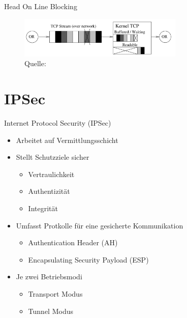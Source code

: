 \documentclass{beamer}
\begin{document}
\begin{frame}{Head On Line Blocking}
  \begin{figure}
    \includegraphics[width=0.7\textwidth]{pics/headonlinevanilla.pdf}
    \caption{Quelle: \cite{tcp-over-dtls}}
  \end{figure}
\end{frame}


\section{IPSec}

\begin{frame}{Internet Protocol Security (IPSec)}
  \begin{itemize}
    \item Arbeitet auf Vermittlungsschicht
    \item Stellt Schutzziele sicher
    \begin{itemize}
      \item Vertraulichkeit
      \item Authentizität
      \item Integrität
    \end{itemize}
    \item Umfasst Protkolle für eine gesicherte Kommunikation
    \begin{itemize}
      \item Authentication Header (AH)
      \item Encapsulating Security Payload (ESP)
    \end{itemize}
    \item Je zwei Betriebsmodi
    \begin{itemize}
      \item Transport Modus
      \item Tunnel Modus
    \end{itemize}
  \end{itemize}
\end{frame}
\end{document}
